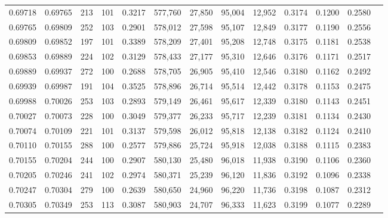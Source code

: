 \begin{tabular}{rrrrrrrrrrrrr}
0.69718 & 0.69765 &   213 & 101 &                                     0.3217 & 577,760 &  27,850 &  95,004 &  12,952 & 0.3174 & 0.1200 & 0.2580 \\
0.69765 & 0.69809 &   252 & 103 &                                     0.2901 & 578,012 &  27,598 &  95,107 &  12,849 & 0.3177 & 0.1190 & 0.2556 \\
0.69809 & 0.69852 &   197 & 101 &                                     0.3389 & 578,209 &  27,401 &  95,208 &  12,748 & 0.3175 & 0.1181 & 0.2538 \\
0.69853 & 0.69889 &   224 & 102 &                                     0.3129 & 578,433 &  27,177 &  95,310 &  12,646 & 0.3176 & 0.1171 & 0.2517 \\
0.69889 & 0.69937 &   272 & 100 &                                     0.2688 & 578,705 &  26,905 &  95,410 &  12,546 & 0.3180 & 0.1162 & 0.2492 \\
0.69939 & 0.69987 &   191 & 104 &                                     0.3525 & 578,896 &  26,714 &  95,514 &  12,442 & 0.3178 & 0.1153 & 0.2475 \\
0.69988 & 0.70026 &   253 & 103 &                                     0.2893 & 579,149 &  26,461 &  95,617 &  12,339 & 0.3180 & 0.1143 & 0.2451 \\
0.70027 & 0.70073 &   228 & 100 &                                     0.3049 & 579,377 &  26,233 &  95,717 &  12,239 & 0.3181 & 0.1134 & 0.2430 \\
0.70074 & 0.70109 &   221 & 101 &                                     0.3137 & 579,598 &  26,012 &  95,818 &  12,138 & 0.3182 & 0.1124 & 0.2410 \\
0.70110 & 0.70155 &   288 & 100 &                                     0.2577 & 579,886 &  25,724 &  95,918 &  12,038 & 0.3188 & 0.1115 & 0.2383 \\
0.70155 & 0.70204 &   244 & 100 &                                     0.2907 & 580,130 &  25,480 &  96,018 &  11,938 & 0.3190 & 0.1106 & 0.2360 \\
0.70205 & 0.70246 &   241 & 102 &                                     0.2974 & 580,371 &  25,239 &  96,120 &  11,836 & 0.3192 & 0.1096 & 0.2338 \\
0.70247 & 0.70304 &   279 & 100 &                                     0.2639 & 580,650 &  24,960 &  96,220 &  11,736 & 0.3198 & 0.1087 & 0.2312 \\
0.70305 & 0.70349 &   253 & 113 &                                     0.3087 & 580,903 &  24,707 &  96,333 &  11,623 & 0.3199 & 0.1077 & 0.2289 \\

\end{tabular}
